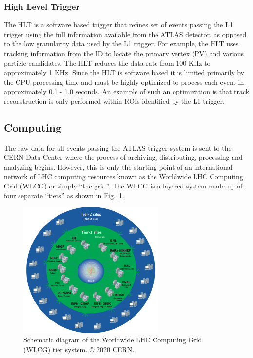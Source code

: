 \subsubsection{High Level Trigger}
The HLT is a software based trigger that refines set of events passing the L1 trigger using the full information available from the ATLAS detector, as opposed to the low granularity data used by the L1 trigger.
For example, the HLT uses tracking information from the ID to locate the primary vertex (PV)  and various particle candidates.
The HLT reduces the data rate from 100 KHz to approximately 1 KHz.
Since the HLT is software based it is limited primarily by the CPU processing time and must be highly optimized to process each event in approximately 0.1 - 1.0 seconds.
An example of such an optimization is that track reconstruction  is only performed within ROIs identified by the L1 trigger.

\subsection{Computing}
The raw data for all events passing the ATLAS trigger system is sent to the CERN Data Center where the process of archiving, distributing, processing and analyzing begins.
However, this is only the starting point of an international network of LHC computing resources \cite{Bird:1447125} known as the Worldwide LHC Computing Grid (WLCG) or simply ``the grid''.
The WLCG is a layered system made up of four separate ``tiers'' as shown in Fig.~\ref{fig:wlcg_tiers}.

\begin{figure}
	\centering
	\includegraphics[width=0.65\textwidth]{wlcg_tiers}
	\caption{Schematic diagram of the Worldwide LHC Computing Grid (WLCG) tier system. © 2020 CERN.}
	\label{fig:wlcg_tiers}
\end{figure}


